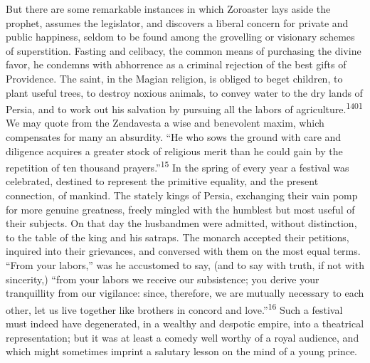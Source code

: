But there are some remarkable instances in which Zoroaster lays
aside the prophet, assumes the legislator, and discovers a
liberal concern for private and public happiness, seldom to be
found among the grovelling or visionary schemes of superstition.
Fasting and celibacy, the common means of purchasing the divine
favor, he condemns with abhorrence as a criminal rejection of the
best gifts of Providence. The saint, in the Magian religion, is
obliged to beget children, to plant useful trees, to destroy
noxious animals, to convey water to the dry lands of Persia, and
to work out his salvation by pursuing all the labors of
agriculture.\textsuperscript{1401} We may quote from the Zendavesta a wise and
benevolent maxim, which compensates for many an absurdity. “He
who sows the ground with care and diligence acquires a greater
stock of religious merit than he could gain by the repetition of
ten thousand prayers.”\textsuperscript{15} In the spring of every year a festival
was celebrated, destined to represent the primitive equality, and
the present connection, of mankind. The stately kings of Persia,
exchanging their vain pomp for more genuine greatness, freely
mingled with the humblest but most useful of their subjects. On
that day the husbandmen were admitted, without distinction, to
the table of the king and his satraps. The monarch accepted their
petitions, inquired into their grievances, and conversed with
them on the most equal terms. “From your labors,” was he
accustomed to say, (and to say with truth, if not with
sincerity,) “from your labors we receive our subsistence; you
derive your tranquillity from our vigilance: since, therefore, we
are mutually necessary to each other, let us live together like
brothers in concord and love.”\textsuperscript{16} Such a festival must indeed
have degenerated, in a wealthy and despotic empire, into a
theatrical representation; but it was at least a comedy well
worthy of a royal audience, and which might sometimes imprint a
salutary lesson on the mind of a young prince.




